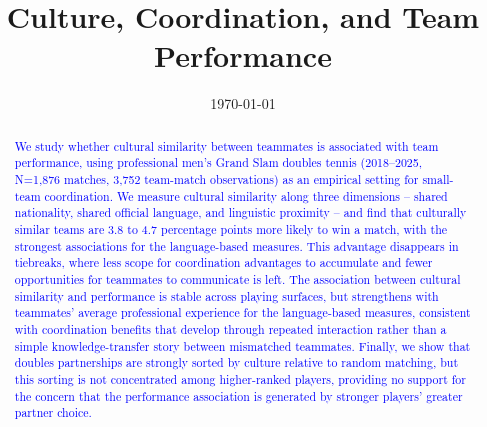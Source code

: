 \documentclass[10pt]{article}
\title{Culture, Coordination, and Team Performance}
\author{}
\date{\today}
\begin{document}
\maketitle
\thispagestyle{empty}

\begin{abstract}
\textcolor{blue}{We study whether cultural similarity between teammates is associated with team performance, using professional men's Grand Slam doubles tennis (2018--2025, N=1,876 matches, 3,752 team-match observations) as an empirical setting for small-team coordination. We measure cultural similarity along three dimensions -- shared nationality, shared official language, and linguistic proximity -- and find that culturally similar teams are 3.8 to 4.7 percentage points more likely to win a match, with the strongest associations for the language-based measures. This advantage disappears in tiebreaks, where less scope for coordination advantages to accumulate and fewer opportunities for teammates to communicate is left. The association between cultural similarity and performance is stable across playing surfaces, but strengthens with teammates' average professional experience for the language-based measures, consistent with coordination benefits that develop through repeated interaction rather than a simple knowledge-transfer story between mismatched teammates. Finally, we show that doubles partnerships are strongly sorted by culture relative to random matching, but this sorting is not concentrated among higher-ranked players, providing no support for the concern that the performance association is generated by stronger players' greater partner choice.}
\end{abstract}
\end{document}
